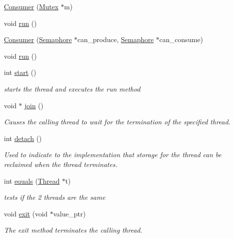 \begin{DoxyCompactItemize}
\item 
\hyperlink{class_consumer_a1b888dac46dbbceec15e4e3f84e1fc90}{\-Consumer} (\hyperlink{class_mutex}{\-Mutex} $\ast$m)
\item 
void \hyperlink{class_consumer_aca00a2a3050f3720fb86661ce706fd75}{run} ()
\item 
\hyperlink{class_consumer_a0935f0ed8b193c521ab781ace9b33295}{\-Consumer} (\hyperlink{class_semaphore}{\-Semaphore} $\ast$can\-\_\-produce, \hyperlink{class_semaphore}{\-Semaphore} $\ast$can\-\_\-consume)
\item 
void \hyperlink{class_consumer_aca00a2a3050f3720fb86661ce706fd75}{run} ()
\item 
int \hyperlink{class_thread_a7d563f3201d081af8cc24ea552c6a4e4}{start} ()
\begin{DoxyCompactList}\small\item\em starts the thread and executes the run method \end{DoxyCompactList}\item 
void $\ast$ \hyperlink{class_thread_a9fc97f64df2c041f08f01e8ade638046}{join} ()
\begin{DoxyCompactList}\small\item\em \-Causes the calling thread to wait for the termination of the specified thread. \end{DoxyCompactList}\item 
int \hyperlink{class_thread_a2a08036a4598cfc554114fee9d0e8485}{detach} ()
\begin{DoxyCompactList}\small\item\em \-Used to indicate to the implementation that storage for the thread can be reclaimed when the thread terminates. \end{DoxyCompactList}\item 
int \hyperlink{class_thread_af10ab7827d62665de0ebc5afbfcf1109}{equals} (\hyperlink{class_thread}{\-Thread} $\ast$t)
\begin{DoxyCompactList}\small\item\em tests if the 2 threads are the same \end{DoxyCompactList}\item 
void \hyperlink{class_thread_a64bc90df36e89fc85705cb6c35c9a81a}{exit} (void $\ast$value\-\_\-ptr)
\begin{DoxyCompactList}\small\item\em \-The exit method terminates the calling thread. \end{DoxyCompactList}\item 

\end{DoxyCompactItemize}
